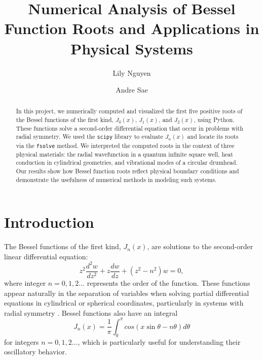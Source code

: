 \documentclass[linenumbers, twocolumn]{aastex631}
\begin{document}
\title{Numerical Analysis of Bessel Function Roots and Applications in Physical Systems}
\author{Lily Nguyen}

\author{Andre Sae}


\begin{abstract}

In this project, we numerically computed and visualized the first five positive
roots of the Bessel functions of the first kind, $J_0(x)$, $J_1(x)$, and $J_2(x)$,
using Python. These functions solve a second-order differential equation that 
occur in problems with radial symmetry. We used the \texttt{scipy} library to
evaluate $J_n(x)$ and locate its roots via the \texttt{fsolve} method. We
interpreted the computed roots in the context of three physical materials: the
radial wavefunction in a quantum infinite square well, heat conduction in
cylindrical geometries, and vibrational modes of a circular drumhead. Our
results show how Bessel function roots reflect physical boundary conditions
and demonstrate the usefulness of numerical methods in modeling such systems.

\end{abstract}



\section{Introduction} \label{sec:intro}

The Bessel functions of the first kind, $J_n(x)$, are solutions to the
second-order linear differential equation:
\begin{equation}
    z^2\frac{d^2 w}{dz^2}+z\frac{dw}{dz}+(z^2-n^2)w=0,
\end{equation}
\noindent where integer $n=0,1,2\dots$ represents the order of the
function. These functions appear naturally in the separation of variables when solving
partial differential equations in cylindrical or spherical coordinates,
particularly in systems with radial symmetry \cite{abramowitz_stegun}. Bessel functions also have an
integral
\begin{equation}
    J_n(x)=\frac{1}{\pi}\int_0^\pi cos(x\sin\theta-n\theta)d\theta
\end{equation}
\noindent for integers $n=0,1,2\dots$, which is particularly useful for understanding 
their oscillatory behavior.
\end{document}
